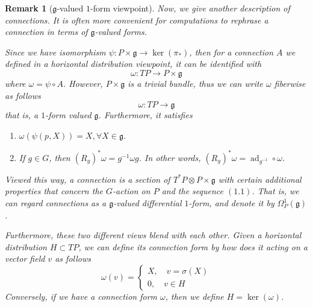 \documentclass[11pt]{amsart}
\numberwithin{equation}{section}
\theoremstyle{plain}
\theoremstyle{plain}
\newtheorem{remksub}[thmsub]{Remark}
\numberwithin{equation}{section}
\begin{document}
\begin{remksub}[$\mathfrak{g}$-valued $1$-form viewpoint]\normalfont
Now, we give another description of connections. It is often more convenient for computations to rephrase a connection in terms of $\mathfrak{g}$-valued forms.

Since we have isomorphism $\psi:P\times\mathfrak{g}\to \operatorname{ker}(\pi_*)$, then for a connection $A$ we defined in a horizontal distribution viewpoint, it can be identified with
$$
\omega:TP\to P\times\mathfrak{g}
$$
where $\omega=\psi\circ A$. However, $P\times\mathfrak{g}$ is a trivial bundle, thus we can write $\omega$ fiberwise as follows
$$
\omega:TP\to \mathfrak{g}
$$
that is, a $1$-form valued $\mathfrak{g}$. Furthermore, it satisfies
\begin{enumerate}[$1.$]
\item $\omega(\psi(p,X))=X,\forall X\in\mathfrak{g}$.
\item If $g\in G$, then $(R_g)^*\omega=g^{-1}\omega g$. In other words, $(R_g)^*\omega=\operatorname{ad}_{g^{-1}}\circ\omega$.
\end{enumerate}

Viewed this way, a connection is a section of $T^*P\otimes P\times\mathfrak{g}$ with certain additional properties that concern the $G$-action on $P$ and the sequence $(1.1)$. That is, we can regard connections as a $\mathfrak{g}$-valued differential $1$-form, and denote it by $\Omega_P^1(\mathfrak{g})$.

Furthermore, these two different views blend with each other. Given a horizontal distribution $H\subset TP$, we can define its connection form by how does it acting on a vector field $v$ as follows
$$
\omega(v)=
\begin{cases}
X,\quad v=\sigma(X)\\
0,\quad v\in H
\end{cases}
$$
Conversely, if we have a connection form $\omega$, then we define $H=\operatorname{ker}(\omega)$.
\end{remksub}
\end{document}
